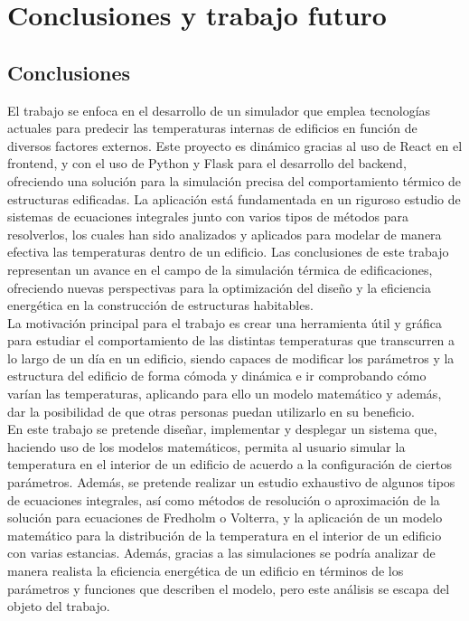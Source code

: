 \chapter{Conclusiones y trabajo futuro}
\section{Conclusiones}
El trabajo se enfoca en el desarrollo de un simulador que emplea tecnologías actuales para predecir las temperaturas internas de edificios en función de diversos factores externos. Este proyecto es dinámico gracias al uso de React en el frontend, y con el uso de Python y Flask para el desarrollo del backend, ofreciendo una solución para la simulación precisa del comportamiento térmico de estructuras edificadas. La aplicación está fundamentada en un riguroso estudio de sistemas de ecuaciones integrales junto con varios tipos de métodos para resolverlos, los cuales han sido analizados y aplicados para modelar de manera efectiva las temperaturas dentro de un edificio. Las conclusiones de este trabajo representan un avance en el campo de la simulación térmica de edificaciones, ofreciendo nuevas perspectivas para la optimización del diseño y la eficiencia energética en la construcción de estructuras habitables.\\

La motivación principal para el trabajo es crear una herramienta útil y gráfica para estudiar el comportamiento de las distintas temperaturas que transcurren a lo largo de un día en un edificio, siendo capaces de modificar los parámetros y la estructura del edificio de forma cómoda y dinámica e ir comprobando cómo varían las temperaturas,  aplicando para ello un modelo matemático y además, dar la posibilidad de que otras personas puedan utilizarlo en su beneficio.\\

En este trabajo se pretende diseñar, implementar y desplegar un sistema que, haciendo uso de los modelos matemáticos, permita al usuario simular la temperatura en el interior de un edificio de acuerdo a la configuración de ciertos parámetros. Además, se pretende realizar un estudio exhaustivo de algunos tipos de ecuaciones integrales, así como métodos de resolución o aproximación de la solución para ecuaciones de Fredholm o Volterra, y la aplicación de un modelo matemático para la distribución de la temperatura en el interior de un edificio con varias estancias. Además, gracias a las simulaciones se podría analizar de manera realista la eficiencia energética de un edificio en términos de los parámetros y funciones que describen el modelo, pero este análisis se escapa del objeto del trabajo.\\

